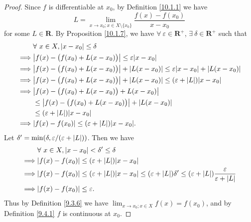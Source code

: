 \begin{proof}
    Since \(f\) is differentiable at \(x_0\), by Definition \ref{10.1.1} we have
    \[
        L = \lim_{x \to x_0 ; x \in X \setminus \{x_0\}} \frac{f(x) - f(x_0)}{x - x_0}
    \]
    for some \(L \in \mathbf{R}\).
    By Proposition \ref{10.1.7}, we have \(\forall\ \varepsilon \in \mathbf{R}^+\), \(\exists\ \delta \in \mathbf{R}^+\) such that
    \begin{align*}
                 & \forall\ x \in X, \abs*{x - x_0} \leq \delta                                                                        \\
        \implies & \abs*{f(x) - \big(f(x_0) + L(x - x_0)\big)} \leq \varepsilon \abs*{x - x_0}                                         \\
        \implies & \abs*{f(x) - \big(f(x_0) + L(x - x_0)\big)} + \abs*{L(x - x_0)} \leq \varepsilon \abs*{x - x_0} + \abs*{L(x - x_0)} \\
        \implies & \abs*{f(x) - \big(f(x_0) + L(x - x_0)\big)} + \abs*{L(x - x_0)} \leq (\varepsilon + \abs*{L}) \abs*{x - x_0}        \\
        \implies & \abs*{f(x) - \big(f(x_0) + L(x - x_0)\big) + L(x - x_0)}                                                            \\
                 & \leq \abs*{f(x) - \big(f(x_0) + L(x - x_0)\big)} + \abs*{L(x - x_0)}                                                \\
                 & \leq (\varepsilon + \abs*{L}) \abs*{x - x_0}                                                                        \\
        \implies & \abs*{f(x) - f(x_0)} \leq (\varepsilon + \abs*{L}) \abs*{x - x_0}.
    \end{align*}
    Let \(\delta' = \min(\delta, \varepsilon / (\varepsilon + \abs*{L}))\).
    Then we have
    \begin{align*}
                 & \forall\ x \in X, \abs*{x - x_0} < \delta' \leq \delta                                                                                                                           \\
        \implies & \abs*{f(x) - f(x_0)} \leq (\varepsilon + \abs*{L}) \abs*{x - x_0}                                                                                                                \\
        \implies & \abs*{f(x) - f(x_0)} \leq (\varepsilon + \abs*{L}) \abs*{x - x_0} \leq (\varepsilon + \abs*{L}) \delta' \leq (\varepsilon + \abs*{L}) \frac{\varepsilon}{\varepsilon + \abs*{L}} \\
        \implies & \abs*{f(x) - f(x_0)} \leq \varepsilon.
    \end{align*}
    Thus by Definition \ref{9.3.6} we have \(\lim_{x \to x_0 ; x \in X} f(x) = f(x_0)\), and by Definition \ref{9.4.1} \(f\) is continuous at \(x_0\).
\end{proof}

